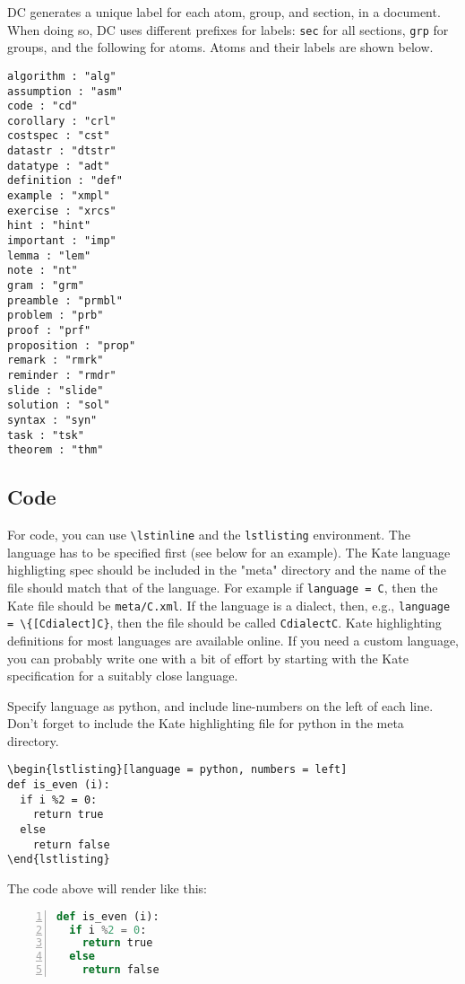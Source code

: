 DC generates a unique label for each atom, group, and section, in a document.
%
When doing so, DC uses different prefixes for labels: \lstinline`sec` for all sections, \lstinline`grp` for groups, and the following for atoms.   Atoms and their labels are shown below.
%
\begin{lstlisting}
algorithm : "alg"
assumption : "asm"
code : "cd"
corollary : "crl"
costspec : "cst"
datastr : "dtstr"
datatype : "adt"
definition : "def"
example : "xmpl"
exercise : "xrcs"
hint : "hint"
important : "imp"
lemma : "lem"
note : "nt"
gram : "grm"
preamble : "prmbl"
problem : "prb"
proof : "prf"
proposition : "prop"
remark : "rmrk"
reminder : "rmdr"
slide : "slide"
solution : "sol"
syntax : "syn"
task : "tsk"
theorem : "thm"
\end{lstlisting}

\subsection{Code}
\label{sec:mtl::code}
For code, you can use \lstinline`\lstinline` and the \lstinline`lstlisting` environment.  The language has to be specified first (see below for an example).  The Kate language highligting spec should be included in the "meta" directory and the name of the file should match that of the language.  For example if \lstinline`language = C`, then the Kate file should be \lstinline`meta/C.xml`.  If the language is a dialect, then, e.g., \lstinline`language = \{[Cdialect]C}`, then the file should be called \lstinline`CdialectC`.  
%
Kate highlighting definitions for most languages are available online.
%
If you need a custom language, you can probably write one with a bit of effort by starting with the Kate specification for a  suitably close language.

\begin{flex}
\begin{example}
Specify language as python, and include  line-numbers on the left of each line.
Don't forget to include the Kate highlighting file for python in the meta directory.

\begin{verbatim}
\begin{lstlisting}[language = python, numbers = left]
def is_even (i):
  if i %2 = 0:
    return true
  else 
    return false
\end{lstlisting}
\end{verbatim}
\end{example}

The code above will render like this:
%
\begin{lstlisting}[language = python, numbers = left]
def is_even (i):
  if i %2 = 0:
    return true
  else 
    return false
\end{lstlisting}
\end{flex}


